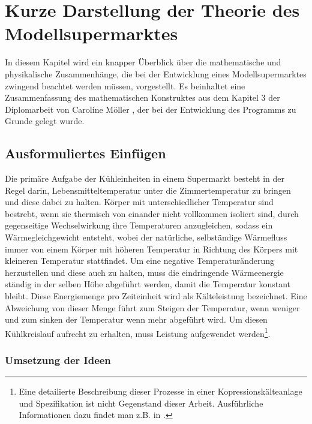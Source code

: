 \chapter{Kurze Darstellung der Theorie des Modellsupermarktes}
\label{chap:theorie}
\minitoc
In diesem Kapitel wird ein knapper Überblick über die mathematische und physikalische Zusammenhänge, die bei der Entwicklung eines
Modellsupermarktes zwingend beachtet werden müssen, vorgestellt. Es beinhaltet eine
Zusammenfassung des mathematischen Konstruktes aus dem Kapitel 3 der Diplomarbeit von Caroline Möller \cite{caro}, der bei der
Entwicklung des Programms zu Grunde gelegt wurde.

\section{Ausformuliertes Einfügen}

Die primäre Aufgabe der Kühleinheiten in einem Supermarkt besteht in der Regel darin, Lebensmitteltemperatur unter die
Zimmertemperatur zu bringen und diese dabei zu halten. Körper mit unterschiedlicher Temperatur sind bestrebt, wenn sie
thermisch von einander nicht vollkommen isoliert sind, durch gegenseitige Wechselwirkung ihre Temperaturen anzugleichen,
sodass ein Wärmegleichgewicht entsteht, wobei der natürliche, selbständige Wärmefluss immer von einem Körper mit höheren
Temperatur in Richtung des Körpers mit kleineren Temperatur stattfindet. Um eine negative Temperaturänderung herzustellen und
diese auch zu halten, muss die eindringende Wärmeenergie ständig in der selben Höhe abgeführt werden, damit die Temperatur
konstant bleibt. Diese Energiemenge pro Zeiteinheit wird als Kälteleistung bezeichnet. Eine Abweichung von dieser Menge führt
zum Steigen der Temperatur, wenn weniger und zum sinken der Temperatur wenn mehr abgeführt wird. Um diesen Kühlkreislauf
aufrecht zu erhalten, muss Leistung aufgewendet werden\footnote{ Eine detailierte Beschreibung dieser Prozesse in einer
Kopressionskälteanlage und Spezifikation ist nicht Gegenstand dieser Arbeit. Ausführliche Informationen dazu findet man z.B.
in \cite{caro, doctor, TAB_A1}.}.


\subsection{Umsetzung der Ideen}

